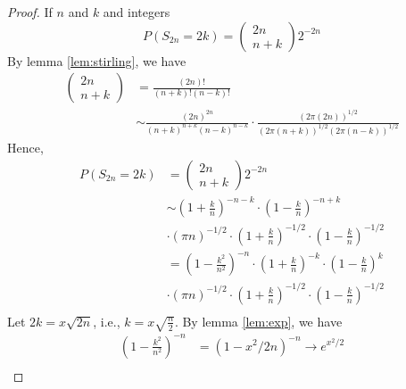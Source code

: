 \begin{proof}
    If $n$ and $k$ and integers
    \begin{equation*}
        P\left(S_{2 n}=2 k\right)=\left(\begin{array}{c}
        2 n \\
        n+k
        \end{array}\right) 2^{-2 n}
    \end{equation*}
    By lemma \ref{lem:stirling}, we have
    \begin{equation*}
        \begin{aligned}
        \left(\begin{array}{c}
        2 n \\
        n+k
        \end{array}\right) &=\frac{(2 n) !}{(n+k) !(n-k) !} \\
        & \sim \frac{(2 n)^{2 n}}{(n+k)^{n+k}(n-k)^{n-k}} \cdot \frac{(2 \pi(2 n))^{1 / 2}}{(2 \pi(n+k))^{1 / 2}(2 \pi(n-k))^{1 / 2}}
        \end{aligned}
    \end{equation*}
    Hence,
    \begin{equation*}
        \begin{aligned}
        P\left(S_{2 n}=2 k\right)&=
        \left(\begin{array}{c}
        2 n \\
        n+k
        \end{array}\right) 2^{-2 n} \\ 
        & \sim\left(1+\frac{k}{n}\right)^{-n-k} \cdot\left(1-\frac{k}{n}\right)^{-n+k} \\
        & \cdot(\pi n)^{-1 / 2} \cdot\left(1+\frac{k}{n}\right)^{-1 / 2} \cdot\left(1-\frac{k}{n}\right)^{-1 / 2} \\
        & =\left(1-\frac{k^{2}}{n^{2}}\right)^{-n} \cdot\left(1+\frac{k}{n}\right)^{-k} \cdot\left(1-\frac{k}{n}\right)^{k} \\
        & \cdot(\pi n)^{-1 / 2} \cdot\left(1+\frac{k}{n}\right)^{-1 / 2} \cdot\left(1-\frac{k}{n}\right)^{-1 / 2} \\
    \end{aligned}
    \end{equation*}
    Let $2k=x\sqrt{2n}$, i.e., $k=x\sqrt{\frac{n}{2}}$. By lemma \ref{lem:exp}, we have
    \begin{equation*}
        \begin{aligned}
        \left(1-\frac{k^{2}}{n^{2}}\right)^{-n} &=\left(1-x^{2} / 2 n\right)^{-n} \rightarrow e^{x^{2} / 2} \\

\end{aligned}
\end{equation*}
\end{proof}
